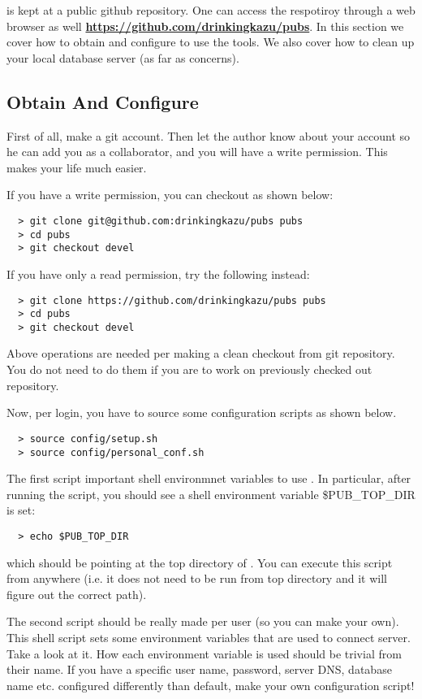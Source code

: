 
{\pubs} is kept at a public github repository. One can access the respotiroy
through a web browser as well
\href{https://github.com/drinkingkazu/pubs}{\color{blue}\bf https://github.com/drinkingkazu/pubs}.
In this section we cover how to obtain {\pubs} and configure to use the tools.
We also cover how to clean up your local database server (as far as {\pubs} concerns).

\subsection{Obtain And Configure {\pubs}}
\label{prep:pubs:conf}
First of all, make a git account. Then let the author know about your account so he
can add you as a collaborator, and you will have a write permission. This makes your
life much easier.

If you have a write permission, you can checkout as shown below:
\begin{lstlisting}
  > git clone git@github.com:drinkingkazu/pubs pubs
  > cd pubs
  > git checkout devel
\end{lstlisting}
If you have only a read permission, try the following instead:
\begin{lstlisting}
  > git clone https://github.com/drinkingkazu/pubs pubs
  > cd pubs
  > git checkout devel
\end{lstlisting}
Above operations are needed per making a clean checkout from git repository.
You do not need to do them if you are to work on previously checked out repository.

Now, per login, you have to source some configuration scripts as shown below.
\begin{lstlisting}
  > source config/setup.sh
  > source config/personal_conf.sh
\end{lstlisting}
The first script important shell environmnet variables to use {\pubs}. In 
particular, after running the script, you should see a shell environment
variable {\ttfamily \$PUB\_TOP\_DIR} is set:
\begin{lstlisting}
  > echo $PUB_TOP_DIR
\end{lstlisting}
which should be pointing at the top directory of {\pubs}. You can execute
this script from anywhere (i.e. it does not need to be run from {\pubs} top
directory and it will figure out the correct path).

The second script should be really made per user (so you can make your own).
This shell script sets some environment variables that are used to connect
{\psql} server. Take a look at it. How each environment variable is used 
should be trivial from their name. If you have a specific user name, password,
server DNS, database name etc. configured differently than default, make
your own configuration script!

